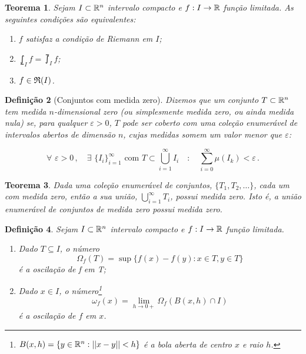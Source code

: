 \documentclass[a4paper,12pt]{extreport}
\newtheorem{mydef}{Definição}
\newtheorem{myteo}[mydef]{Teorema}
\newif\ifspacesbetweentheos
\newcommand{\theospace}[1]{
\ifspacesbetweentheos
  \vspace{#1}
\fi
}
\newcommand{\theonewpage}{
\ifspacesbetweentheos
  \newpage
\fi
}
\begin{document}
\theonewpage


\begin{myteo}\label{teo:int_sup_inf_riemann_int}
  Sejam $I \subset \mathbb{R}^n$ intervalo compacto e
  $f:I \to \mathbb{R}$ função limitada.
  As seguintes condições são equivalentes:
  \begin{enumerate}[label=\roman*)]
  \item $f$ satisfaz a condição de Riemann em $I$;
  \item $\lowint_I f = \upint_I f$;
  \item $f \in \mathfrak{R}(I) $.
  \end{enumerate}    
\end{myteo}


\theonewpage


\begin{mydef}[Conjuntos com medida zero]\label{def:medida_zero}
  Dizemos que um conjunto $T \subset \mathbb{R}^n$ tem
  \emph{medida $n$-dimensional zero}
  (ou simplesmente \emph{medida zero},
  ou ainda \emph{medida nula}) se,
  para qualquer $\varepsilon > 0$,
  $T$ pode ser coberto com uma coleção enumerável de intervalos
  abertos de dimensão $n$,
  cujas medidas somem um valor menor que $\varepsilon$:

  $$ \forall \,\, \varepsilon > 0 \,,\quad
  \exists \,\, \{I_i\}_{i=1}^\infty \text{ com }
  T \subset \bigcup_{i=1}^\infty I_i
  \quad : \quad
  \sum_{i=0}^\infty \mu(I_k) < \varepsilon \,.$$
\end{mydef}


\theospace{5cm}


\begin{myteo}\label{teo:uniao_enum_med_zero}
  Dada uma coleção enumerável de conjuntos, $\{T_1, T_2, \dots \}$,
  cada um com medida zero, então a sua união,
  $\bigcup_{i=1}^\infty T_i$,
  possui medida zero.
  Isto é, a união enumerável de conjuntos de medida zero possui
  medida zero.
\end{myteo}  


\theonewpage


\begin{mydef}\label{def:oscilacao}
  Sejam $I \subset \mathbb{R}^n$ intervalo compacto e
  $f:I \to \mathbb{R}$ função limitada.
  \begin{enumerate}[label=\alph*)]
  \item Dado $T \subseteq I$, o número
    \begin{equation}
      \Omega_f(T) = \sup \{ f(x) - f(y) : x \in T, y \in T \}
    \end{equation}
    é a \emph{oscilação} de f em T;
  \item Dado $x \in I$, o número\footnote{
      $B(x,h) = \{y \in \mathbb{R}^n : ||x-y|| < h\}$
      é a bola aberta de centro $x$ e raio $h$.}
    \begin{equation}
      \omega_f(x) = \lim_{h \to 0+} \Omega_f(B(x,h) \cap I)
    \end{equation}
    é a \emph{oscilação} de $f$ em $x$.
  \end{enumerate}
\end{mydef}
\end{document}

